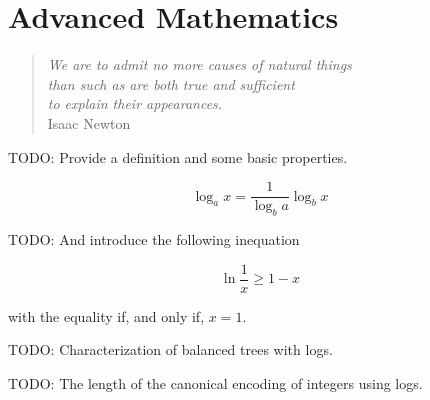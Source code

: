 %
%


\chapter{Advanced Mathematics}
\label{apx:math}

\begin{quote}
\begin{flushright}
\emph{We are to admit no more causes of natural things \\
than such as are both true and sufficient \\
to explain their appearances.}\\
Isaac Newton
\end{flushright}
\end{quote}
\bigskip

{\color{red} TODO: Provide a definition and some basic properties.}

\begin{equation}
\label{eq:change_base_logarithm}
\log_a x = \frac{1}{\log_b a} \log_b x
\end{equation}

{\color{red} TODO: And introduce the following inequation}

\begin{equation}
\label{eq:natural_logarithm_inequality}
\ln \frac{1}{x} \geq 1 - x
\end{equation}

with the equality if, and only if, $x=1$.

{\color{red} TODO: Characterization of balanced trees with logs.}

{\color{red} TODO: The length of the canonical encoding of integers using logs.}





